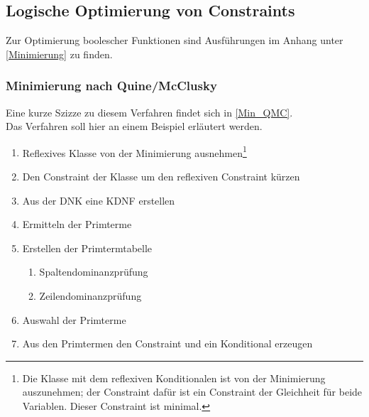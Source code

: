 \documentclass[a4paper, 11pt]{book}
\begin{document}
\subsection{Logische Optimierung von Constraints} \label{LogOpt}
Zur Optimierung boolescher Funktionen sind Ausführungen im Anhang unter \ref{Minimierung} zu finden.
\subsubsection{Minimierung nach Quine/McClusky} \label{Min_Besch_QMC} 
Eine kurze Szizze zu diesem Verfahren findet sich in \ref{Min_QMC}.\\
Das Verfahren soll hier an einem Beispiel erläutert werden.
\begin{enumerate}
	\item Reflexives Klasse von der Minimierung ausnehmen\footnote{Die Klasse mit dem reflexiven Konditionalen ist von der Minimierung auszunehmen; der Constraint dafür ist ein Constraint der Gleichheit für beide Variablen. Dieser Constraint ist minimal.}
	\item Den Constraint der Klasse um den reflexiven Constraint kürzen
	\item Aus der DNK eine KDNF erstellen 
	\item Ermitteln der Primterme
	\item Erstellen der Primtermtabelle
	\begin{enumerate}
		\item Spaltendominanzprüfung
		\item Zeilendominanzprüfung
	\end{enumerate}
	\item Auswahl der Primterme
	\item Aus den Primtermen den Constraint und ein Konditional erzeugen	
\end{enumerate}
\end{document}
